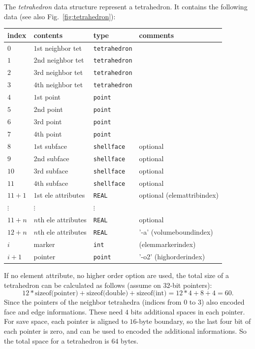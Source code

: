 The {\it tetrahedron} data structure represent a tetrahedron. It contains the following data (see also Fig.~\ref{fig:tetrahedron}):\\
\begin{tabular}{l | l | l | l}
 index & contents & type & comments\\ \hline
 $0$ & $1$st neighbor tet & {\tt tetrahedron} & \\
 $1$ & $2$nd neighbor tet & {\tt tetrahedron} & \\
 $2$ & $3$rd neighbor tet & {\tt tetrahedron} & \\
 $3$ & $4$th neighbor tet & {\tt tetrahedron} & \\ \hline
 $4$ & $1$st point & {\tt point} & \\
 $5$ & $2$nd point & {\tt point} & \\
 $6$ & $3$rd point & {\tt point} & \\
 $7$ & $4$th point & {\tt point} & \\ \hline
 $8$ & $1$st subface & {\tt shellface} & optional \\
 $9$ & $2$nd subface & {\tt shellface} & optional \\
 $10$ & $3$rd subface & {\tt shellface} & optional \\
 $11$ & $4$th subface & {\tt shellface} & optional \\ \hline
 $11 + 1$ & $1$st ele attributes & {\tt REAL} & optional (elemattribindex) \\
 $\vdots$ & $\vdots$ & $\vdots$ & \\
 $11 + n$ & $n$th ele attributes & {\tt REAL} & optional \\ \hline
 $12 + n$ & $n$th ele attributes & {\tt REAL} & '-a' (volumeboundindex) \\  \hline
 $i$ & marker & {\tt int} & (elemmarkerindex)\\ \hline
 $i+1$ & pointer & {\tt point} & '-o2' (highorderindex)
\end{tabular}

If no element attribute, no higher order option are used, the total size of a tetrahedron can be calculated as follows (assume on $32$-bit pointers):
\[
 12 * \textrm{sizeof(pointer)} + \textrm{sizeof(double)} + \textrm{sizeof(int)} = 12 * 4 + 8 + 4 = 60.
\]
Since the pointers of the neighbor tetrahedra (indices from $0$ to $3$) also encoded face and edge informations. These need $4$ bits additional spaces in each pointer. For save space, each pointer is aligned to $16$-byte boundary, so the last four bit of each pointer is zero, and can be used to encoded the additional informations. So the total space for a tetrahedron is $64$ bytes.


